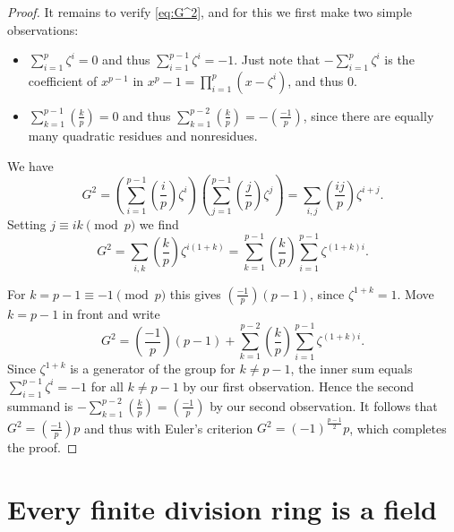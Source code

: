 \begin{proof}
  It remains to verify \eqref{eq:G^2}, and for this we first make two simple observations:
  \begin{itemize}
  	\item $\sum_{i=1}^{p} \zeta^i = 0$ and thus $\sum_{i=1}^{p-1} \zeta^i = -1$. Just note that $-\sum_{i=1}^{p} \zeta^i$ is the coefficient of $x^{p-1}$ in $x^p - 1 = \prod_{i=1}^{p} (x - \zeta^i)$, and thus 0.
  	\item $\sum_{k=1}^{p-1} (\frac{k}{p}) = 0$ and thus $\sum_{k=1}^{p-2} (\frac{k}{p}) = - (\frac{-1}{p})$, since there are equally many quadratic residues and nonresidues.
  \end{itemize}
  
  We have
  \[
  G^2 = \left(\sum_{i=1}^{p-1} (\frac{i}{p}) \zeta^i\right) \left(\sum_{j=1}^{p-1} (\frac{j}{p}) \zeta^j\right) = \sum_{i,j} (\frac{ij}{p}) \zeta^{i+j}.
  \]
  Setting $j \equiv ik \pmod{p}$ we find
  \[
  G^2 = \sum_{i,k} (\frac{k}{p}) \zeta^{i(1+k)} = \sum_{k=1}^{p-1} (\frac{k}{p}) \sum_{i=1}^{p-1} \zeta^{(1+k)i}.
  \]
  
  For $k = p - 1 \equiv -1 \pmod{p}$ this gives $(\frac{-1}{p}) (p - 1)$, since $\zeta^{1+k} = 1$. Move $k = p - 1$ in front and write
  \[
  G^2 = (\frac{-1}{p}) (p - 1) + \sum_{k=1}^{p-2} (\frac{k}{p}) \sum_{i=1}^{p-1} \zeta^{(1+k)i}.
  \]
  Since $\zeta^{1+k}$ is a generator of the group for $k \ne p - 1$, the inner sum equals $\sum_{i=1}^{p-1} \zeta^i = -1$ for all $k \ne p - 1$ by our first observation. Hence the second summand is $-\sum_{k=1}^{p-2} (\frac{k}{p}) = (\frac{-1}{p})$ by our second observation. It follows that $G^2 = (\frac{-1}{p}) p$ and thus with Euler's criterion $G^2 = (-1)^{\frac{p-1}{2}} p$, which completes the proof.
\end{proof}


\chapter{Every finite division ring is a field}

